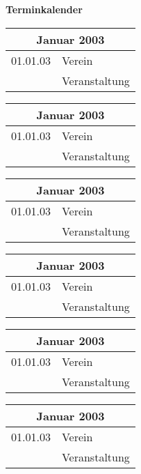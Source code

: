 \documentclass[german,10pt]{article}
\begin{document}
{\huge\textbf{Terminkalender}}\\

\begin{tabular}{|cl|}
\hline 
\multicolumn{2}{|p{38mm}|}{\textbf{Januar 2003}}\\
\hline
\hline 
\footnotesize{01.01.03}&
\footnotesize{Verein}\\
&
\footnotesize{Veranstaltung}\\
\hline
\end{tabular}\begin{tabular}{|cl|}
\hline 
\multicolumn{2}{|p{38mm}|}{\textbf{Januar 2003}}\\
\hline
\hline 
\footnotesize{01.01.03}&
\footnotesize{Verein}\\
&
\footnotesize{Veranstaltung}\\
\hline
\end{tabular}\begin{tabular}{|cl|}
\hline 
\multicolumn{2}{|p{38mm}|}{\textbf{Januar 2003}}\\
\hline
\hline 
\footnotesize{01.01.03}&
\footnotesize{Verein}\\
&
\footnotesize{Veranstaltung}\\
\hline
\end{tabular}\begin{tabular}{|cl|}
\hline 
\multicolumn{2}{|p{38mm}|}{\textbf{Januar 2003}}\\
\hline
\hline 
\footnotesize{01.01.03}&
\footnotesize{Verein}\\
&
\footnotesize{Veranstaltung}\\
\hline
\end{tabular}\begin{tabular}{|cl|}
\hline 
\multicolumn{2}{|p{38mm}|}{\textbf{Januar 2003}}\\
\hline
\hline 
\footnotesize{01.01.03}&
\footnotesize{Verein}\\
&
\footnotesize{Veranstaltung}\\
\hline
\end{tabular}\begin{tabular}{|cl|}
\hline 
\multicolumn{2}{|p{38mm}|}{\textbf{Januar 2003}}\\
\hline
\hline 
\footnotesize{01.01.03}&
\footnotesize{Verein}\\
&
\footnotesize{Veranstaltung}\\
\hline
\end{tabular}
\end{document}
